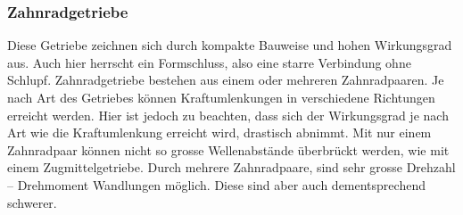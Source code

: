 \subsubsection{Zahnradgetriebe}
Diese Getriebe zeichnen sich durch kompakte Bauweise und hohen Wirkungsgrad aus. Auch hier herrscht ein Formschluss, also eine starre Verbindung ohne Schlupf. Zahnradgetriebe bestehen aus einem oder mehreren Zahnradpaaren. Je nach Art des Getriebes können Kraftumlenkungen in verschiedene Richtungen erreicht werden. Hier ist jedoch zu beachten, dass sich der Wirkungsgrad je nach Art wie die Kraftumlenkung erreicht wird, drastisch abnimmt. Mit nur einem Zahnradpaar können nicht so grosse Wellenabstände überbrückt werden, wie mit einem Zugmittelgetriebe. Durch mehrere Zahnradpaare, sind sehr grosse Drehzahl – Drehmoment Wandlungen möglich. Diese sind aber auch dementsprechend schwerer. 